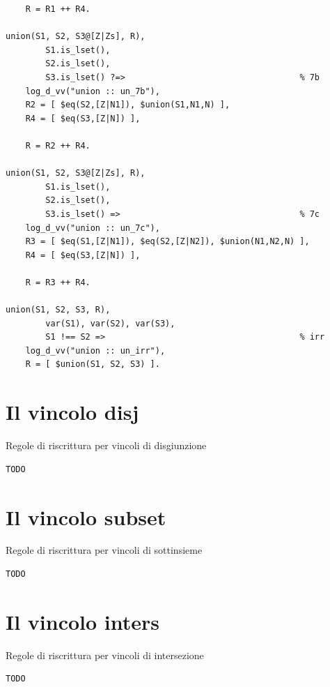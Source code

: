 \documentclass[12pt,a4paper,openright]{book}  %
\begin{document}
\begin{verbatim}
    R = R1 ++ R4.

union(S1, S2, S3@[Z|Zs], R),
        S1.is_lset(),
        S2.is_lset(),
        S3.is_lset() ?=>                                   % 7b
    log_d_vv("union :: un_7b"),
    R2 = [ $eq(S2,[Z|N1]), $union(S1,N1,N) ],
    R4 = [ $eq(S3,[Z|N]) ],

    R = R2 ++ R4.

union(S1, S2, S3@[Z|Zs], R),
        S1.is_lset(),
        S2.is_lset(),
        S3.is_lset() =>                                    % 7c
    log_d_vv("union :: un_7c"),
    R3 = [ $eq(S1,[Z|N1]), $eq(S2,[Z|N2]), $union(N1,N2,N) ],
    R4 = [ $eq(S3,[Z|N]) ],

    R = R3 ++ R4.

union(S1, S2, S3, R),
        var(S1), var(S2), var(S3),
        S1 !== S2 =>                                       % irr
    log_d_vv("union :: un_irr"),
    R = [ $union(S1, S2, S3) ].
\end{verbatim}

\section{Il vincolo disj}

\begin{algorithm}[H]
	\caption{Regole di riscrittura per vincoli di disgiunzione}
	\label{alg:disj_constraints}
\end{algorithm}
\begin{verbatim}
TODO
\end{verbatim}


\section{Il vincolo subset}

\begin{algorithm}[H]
	\caption{Regole di riscrittura per vincoli di sottinsieme}
	\label{alg:subset_constraints}
\end{algorithm}
\begin{verbatim}
TODO
\end{verbatim}


\section{Il vincolo inters}

\begin{algorithm}[H]
	\caption{Regole di riscrittura per vincoli di intersezione}
	\label{alg:inters_constraints}
\end{algorithm}
\begin{verbatim}
TODO
\end{verbatim}
\end{document}

